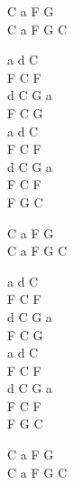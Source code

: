 \begin{chord}
    C a F G\\
    C a F G C
	
    a d C\\
    F C F\\
    d C G a\\
    F C G\\
    a d C\\
    F C F\\
    d C G a\\
    F C F\\
    F G C
	
	C a F G\\
    C a F G C

    a d C\\
    F C F\\
    d C G a\\
    F C G\\
    a d C\\
    F C F\\
    d C G a\\
    F C F\\
    F G C
	
    C a F G\\
    C a F G C
\end{chord}